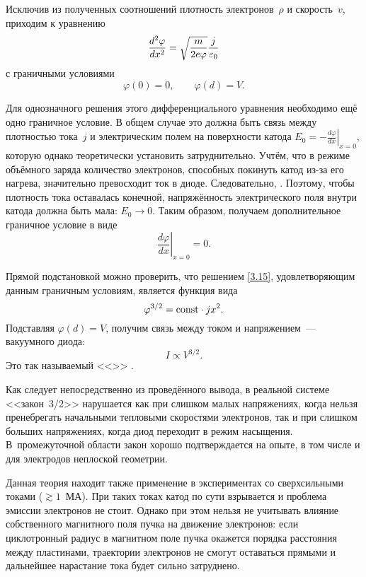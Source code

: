 Исключив из полученных соотношений плотность электронов~$\rho$ и скорость~$v$,
приходим к уравнению
\begin{equation}
    \eqmark{3.15}
    \frac{d^2\varphi}{dx^2}=\sqrt{\frac{m}{2e\varphi}} \frac{j}{\varepsilon_0}
\end{equation}
с граничными условиями
\begin{equation*}
 \varphi(0)=0,\qquad \varphi(d)=V.
\end{equation*}

Для однозначного решения этого дифференциального уравнения необходимо ещё одно
граничное условие. В общем случае это должна быть связь между плотностью
тока~$j$ и электрическим полем на поверхности катода
$E_0 = -\left.\frac{d\varphi}{dx}\right|_{x=0}$,
которую однако теоретически установить затруднительно.
Учтём, что в режиме объёмного заряда количество электронов, способных покинуть
катод из-за его нагрева, значительно превосходит ток в диоде.
Следовательно, . Поэтому, чтобы плотность тока оставалась конечной,
напряжённость электрического поля внутри катода должна быть мала: $E_0\to 0$.
Таким образом, получаем дополнительное граничное условие в виде
\begin{equation*}
    \left.\frac{d\varphi}{dx}\right|_{x = 0}=0.
\end{equation*}

Прямой подстановкой можно проверить, что решением \eqref{3.15},
удовлетворяющим данным граничным условиям, является функция вида
\begin{equation*}
    \varphi^{3/2} =\mathrm{const} \cdot j x^2.
\end{equation*}
Подставляя $\varphi(d)=V$, получим связь между током и напряжением~---
 вакуумного диода:
\begin{equation}
    I \propto V^{3/2}.
\end{equation}
Это так называемый <<>> .

\begin{lab:note}
Как следует непосредственно из проведённого вывода, в реальной системе
<<закон~3/2>> нарушается как при слишком малых напряжениях,
когда нельзя пренебрегать начальными тепловыми скоростями электронов,
так и при слишком больших напряжениях, когда диод переходит в режим насыщения.
В~промежуточной области закон хорошо подтверждается на опыте, в том числе
и для электродов неплоской геометрии.

Данная теория находит также применение в экспериментах со сверхсильными
токами ($\gtrsim 1$~МА). При таких токах катод по сути взрывается и проблема
эмиссии электронов не стоит. Однако при этом нельзя не учитывать
влияние собственного магнитного поля пучка на движение электронов:
если циклотронный радиус в магнитном поле пучка окажется порядка
расстояния между пластинами, траектории электронов не смогут
оставаться прямыми и дальнейшее нарастание тока будет сильно
затруднено.
\end{lab:note}


